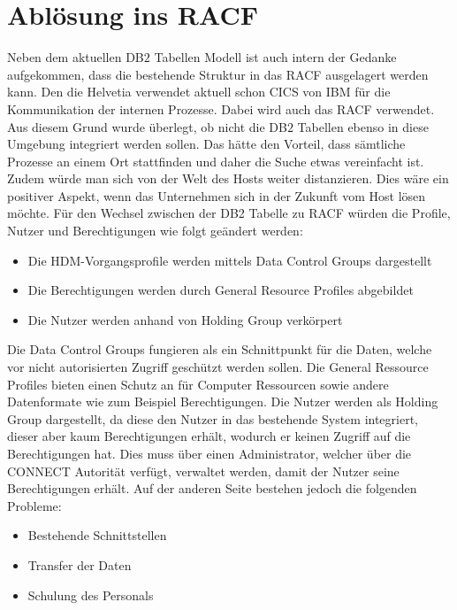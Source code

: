 \section{Ablösung ins RACF}
\label{sec:chapter05:racF}
Neben dem aktuellen DB$2$ Tabellen Modell ist auch intern der Gedanke aufgekommen, dass die bestehende Struktur in das \ac{RACF} ausgelagert werden kann.
Den die Helvetia verwendet aktuell schon \ac{CICS} von IBM für die Kommunikation der internen Prozesse.
Dabei wird auch das \ac{RACF} verwendet.
Aus diesem Grund wurde überlegt, ob nicht die DB$2$ Tabellen ebenso in diese Umgebung integriert werden sollen.
Das hätte den Vorteil, dass sämtliche Prozesse an einem Ort stattfinden und daher die Suche etwas vereinfacht ist.
Zudem würde man sich von der Welt des Hosts weiter distanzieren.
Dies wäre ein positiver Aspekt, wenn das Unternehmen sich in der Zukunft vom Host lösen möchte.
\newline
\newline
Für den Wechsel zwischen der DB2 Tabelle zu \ac{RACF} würden die Profile, Nutzer und Berechtigungen wie folgt geändert werden:
\begin{itemize}
	\item Die HDM-Vorgangsprofile werden mittels Data Control Groups dargestellt
	\item Die Berechtigungen werden durch General Resource Profiles abgebildet
	\item Die Nutzer werden anhand von Holding Group verkörpert
\end{itemize}
Die Data Control Groups fungieren als ein Schnittpunkt für die Daten, welche vor nicht autorisierten Zugriff geschützt werden sollen. \cite{IBMdcg}
Die General Ressource Profiles bieten einen Schutz an für Computer Ressourcen sowie andere Datenformate wie zum Beispiel Berechtigungen. \cite{IBMgrp}
Die Nutzer werden als Holding Group dargestellt, da diese den Nutzer in das bestehende System integriert, dieser aber kaum Berechtigungen erhält, wodurch er keinen Zugriff auf die Berechtigungen hat.
Dies muss über einen Administrator, welcher über die CONNECT Autorität verfügt, verwaltet werden, damit der Nutzer seine Berechtigungen erhält. \cite{IBMhg}
\newline
\newline
Auf der anderen Seite bestehen jedoch die folgenden Probleme:
\begin{itemize}
	\item Bestehende Schnittstellen
	\item Transfer der Daten
	\item Schulung des Personals
\end{itemize}

